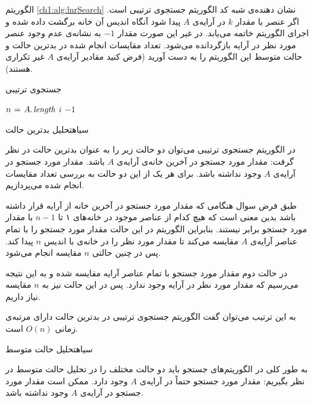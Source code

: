 { الگوریتم {\eqref{ch1:alg:lnrSearch}} نشان دهنده‌ی شبه کد الگوریتم جستجوی ترتیبی است. اگر عنصر با مقدار {$k$} در آرایه‌ی {$A$} پیدا شود آنگاه اندیس آن خانه برگشت داده شده و اجرای الگوریتم خاتمه می‌یابد. در غیر این صورت مقدار {$-1$} به نشانه‌ی عدم وجود عنصر مورد نظر در آرایه بازگردانده می‌شود. تعداد مقایسات انجام ‌شده در بدترین حالت و حالت متوسط این الگوریتم را به دست آورید (فرض کنید مقادیر آرایه‌ی {$A$} غیر تکراری هستند).

\begin{algorithm}
\caption{جستجوی ترتیبی}\label{ch1:alg:lnrSearch}
\begin{latin}
\begin{algorithmic}[1]
		\State $n \mathrel{\hspace{1pt}=\hspace{1pt}} A.\hspace*{1pt}\mathit{length}$
						\State \Return $i$
				\EndIf
		\EndFor
		\State \Return	$-1$		
\EndFunction
\end{algorithmic}
\end{latin}
\end{algorithm}


‌سیاه{تحلیل بدترین حالت}

در الگوریتم جستجوی ترتیبی می‌توان دو حالت زیر را به عنوان بدترین حالت در نظر گرفت:
 مقدار مورد جستجو در آخرین خانه‌ی آرایه‌ی {$A$} باشد.
 مقدار مورد جستجو در آرایه‌ی {$A$} وجود نداشته باشد.
برای هر یک از این دو حالت به بررسی تعداد مقایسات انجام ‌شده می‌پردازیم.

طبق فرض سوال هنگامی که مقدار مورد جستجو در آخرین خانه از آرایه قرار داشته باشد بدین معنی است که هیچ ‌کدام از عناصر موجود در خانه‌های ۱ تا {$n-1$} با مقدار مورد جستجو برابر نیستند. بنابراین الگوریتم در این حالت مقدار مورد جستجو را با تمام عناصر آرایه‌ی {$A$} مقایسه می‌کند تا مقدار مورد نظر را در خانه‌ی با اندیس {$n$} پیدا کند. پس در چنین حالتی {$n$} مقایسه انجام می‌شود.

در حالت دوم مقدار مورد جستجو با تمام عناصر آرایه مقایسه شده و به این نتیجه می‌رسیم که مقدار مورد نظر در آرایه وجود ندارد. پس در این حالت نیز به {$n$} مقایسه نیاز داریم.

به این ترتیب می‌توان گفت الگوریتم جستجوی ترتیبی در بدترین حالت دارای مرتبه‌ی زمانی {$O(n)$} است.

‌سیاه{تحلیل حالت متوسط}

به طور کلی در الگوریتم‌های جستجو باید دو حالت مختلف را در تحلیل حالت متوسط در نظر بگیریم:
 مقدار مورد جستجو حتماً در آرایه‌ی {$A$} وجود دارد.
 ممکن است مقدار مورد جستجو در آرایه‌ی {$A$} وجود نداشته باشد.

}

